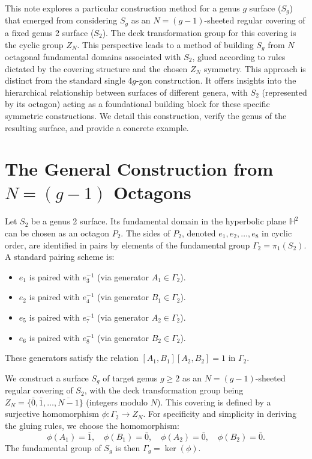 \documentclass{article}
\theoremstyle{definition}
\theoremstyle{remark}
\begin{document}
This note explores a particular construction method for a genus $g$ surface ($S_g$) that emerged from considering $S_g$ as an $N=(g-1)$-sheeted regular covering of a fixed genus 2 surface ($S_2$). The deck transformation group for this covering is the cyclic group $Z_N$. This perspective leads to a method of building $S_g$ from $N$ octagonal fundamental domains associated with $S_2$, glued according to rules dictated by the covering structure and the chosen $Z_N$ symmetry. This approach is distinct from the standard single $4g$-gon construction. It offers insights into the hierarchical relationship between surfaces of different genera, with $S_2$ (represented by its octagon) acting as a foundational building block for these specific symmetric constructions. We detail this construction, verify the genus of the resulting surface, and provide a concrete example.

\section{The General Construction from $N=(g-1)$ Octagons}

Let $S_2$ be a genus 2 surface. Its fundamental domain in the hyperbolic plane $\mathbb{H}^2$ can be chosen as an octagon $P_2$. The sides of $P_2$, denoted $e_1, e_2, \ldots, e_8$ in cyclic order, are identified in pairs by elements of the fundamental group $\Gamma_2 = \pi_1(S_2)$. A standard pairing scheme is:
\begin{itemize}
    \item $e_1$ is paired with $e_3^{-1}$ (via generator $A_1 \in \Gamma_2$).
    \item $e_2$ is paired with $e_4^{-1}$ (via generator $B_1 \in \Gamma_2$).
    \item $e_5$ is paired with $e_7^{-1}$ (via generator $A_2 \in \Gamma_2$).
    \item $e_6$ is paired with $e_8^{-1}$ (via generator $B_2 \in \Gamma_2$).
\end{itemize}
These generators satisfy the relation $[A_1, B_1][A_2, B_2] = 1$ in $\Gamma_2$.

We construct a surface $S_g$ of target genus $g \ge 2$ as an $N=(g-1)$-sheeted regular covering of $S_2$, with the deck transformation group being $Z_N = \{\bar{0}, \bar{1}, \ldots, \overline{N-1}\}$ (integers modulo $N$). This covering is defined by a surjective homomorphism $\phi: \Gamma_2 \to Z_N$. For specificity and simplicity in deriving the gluing rules, we choose the homomorphism:
$$ \phi(A_1) = \bar{1}, \quad \phi(B_1) = \bar{0}, \quad \phi(A_2) = \bar{0}, \quad \phi(B_2) = \bar{0}. $$
The fundamental group of $S_g$ is then $\Gamma_g = \ker(\phi)$.
\end{document}
